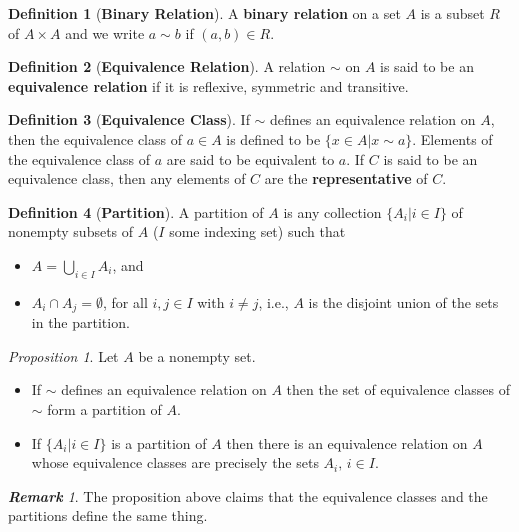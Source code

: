 \documentclass[paper=a4, fontsize=11pt]{scrartcl}
\numberwithin{equation}{section}		%
\numberwithin{figure}{section}			%
\numberwithin{table}{section}				%
\theoremstyle{definition}
\newtheorem{definition}{Definition}[section]
\theoremstyle{remark}
\newtheorem*{remark}{\textbf{Remark}}
\theoremstyle{example}
\newtheorem{prop}{Proposition}[section]
\begin{document}
\begin{definition}[\textbf{Binary Relation}]
    A \textbf{binary relation} on a set $A$ is a subset $R$ of $A \times A$ and we write $a \sim b$ if $(a,b) \in R$.
\end{definition}

\begin{definition}[\textbf{Equivalence Relation}]
    A relation $\sim$ on $A$ is said to be an \textbf{equivalence relation} if it is reflexive, symmetric and transitive.
\end{definition}

\begin{definition}[\textbf{Equivalence Class}]
    If $\sim$ defines an equivalence relation on $A$, then the equivalence class of $a \in A$ is defined to be $\{x \in A \lvert x \sim a\}$. Elements of the equivalence class of $a$ are said to be equivalent to $a$. If $C$ is said to be an equivalence class, then any elements of $C$ are the \textbf{representative} of $C$.
\end{definition}

\begin{definition}[\textbf{Partition}]
    A partition of $A$ is any collection $\{A_i \lvert i \in I\}$ of nonempty subsets of $A$ ($I$ some indexing set) such that
    \begin{itemize}
        \item $A = \bigcup_{i\in I}A_i$, and
        \item $A_i \cap A_j = \emptyset$, for all $i,j \in I$ with $i \neq j$, i.e., $A$ is the disjoint union of the sets in the partition.
    \end{itemize}
\end{definition}

\begin{prop}
    Let $A$ be a nonempty set.
    \begin{itemize}
        \item If $\sim$ defines an equivalence relation on $A$ then the set of equivalence classes of $\sim$ form a partition of $A$.
        \item If $\{A_i \lvert i \in I\}$ is a partition of $A$ then there is an equivalence relation on $A$ whose equivalence classes are precisely the sets $A_i, \, i \in I$.
    \end{itemize}
\end{prop}

\begin{remark}
    The proposition above claims that the equivalence classes and the partitions define the same thing.
\end{remark}
\end{document}
